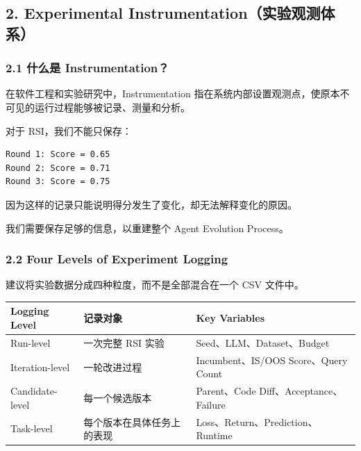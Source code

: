 \hypertarget{part-3-48-0001-experimental-instrumentationux5b9eux9a8cux89c2ux6d4bux4f53ux7cfb}{%
\subsection{2. Experimental Instrumentation（实验观测体系）}\label{part-3-48-0001-experimental-instrumentationux5b9eux9a8cux89c2ux6d4bux4f53ux7cfb}}

\hypertarget{part-3-48-0001-ux4ec0ux4e48ux662f-instrumentation}{%
\subsubsection{2.1 什么是 Instrumentation？}\label{part-3-48-0001-ux4ec0ux4e48ux662f-instrumentation}}

在软件工程和实验研究中，Instrumentation 指在系统内部设置观测点，使原本不可见的运行过程能够被记录、测量和分析。

对于 RSI，我们不能只保存：

\begin{verbatim}
Round 1: Score = 0.65
Round 2: Score = 0.71
Round 3: Score = 0.75
\end{verbatim}

因为这样的记录只能说明得分发生了变化，却无法解释变化的原因。

我们需要保存足够的信息，以重建整个 Agent Evolution Process。


\hypertarget{part-3-48-0001-four-levels-of-experiment-logging}{%
\subsubsection{2.2 Four Levels of Experiment Logging}\label{part-3-48-0001-four-levels-of-experiment-logging}}

建议将实验数据分成四种粒度，而不是全部混合在一个 CSV 文件中。

\begin{readertable}
\begin{longtable}[]{@{}
  >{\raggedright\arraybackslash}p{}
  >{\raggedright\arraybackslash}p{}
  >{\raggedright\arraybackslash}p{}@{}}
\toprule
Logging Level & 记录对象 & Key Variables \\
\midrule
\endhead
Run-level & 一次完整 RSI 实验 & Seed、LLM、Dataset、Budget \\
Iteration-level & 一轮改进过程 & Incumbent、IS/OOS Score、Query Count \\
Candidate-level & 每一个候选版本 & Parent、Code Diff、Acceptance、Failure \\
Task-level & 每个版本在具体任务上的表现 & Loss、Return、Prediction、Runtime \\
\bottomrule
\end{longtable}
\end{readertable}


